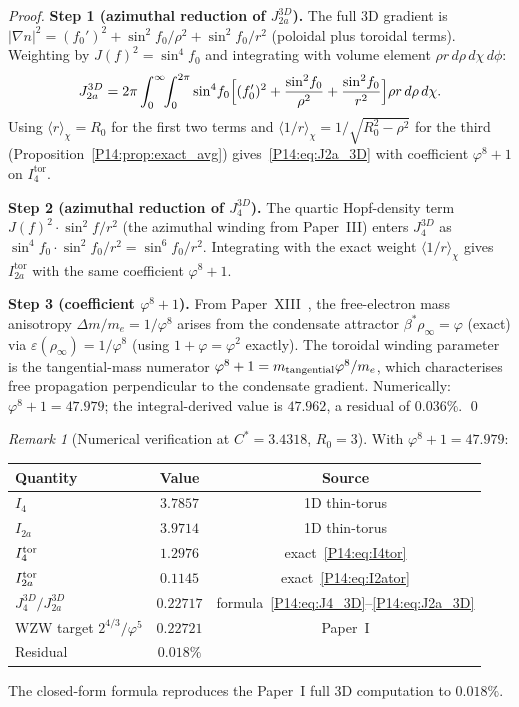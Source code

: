 \documentclass[11pt,a4paper]{article}
\theoremstyle{definition}
\theoremstyle{remark}
\newtheorem{remark}[theorem]{Remark}
\newcommand{\vp}{\varphi}
\newcommand{\bst}{\beta^{*}}
\newcommand{\Jfour}{J_4}
\newcommand{\Ja}{J_{2a}}
\newcommand{\Cstar}{C^*}
\newcommand{\fzero}{f_0}
\newcommand{\Rzero}{R_0}
\newcommand{\Itor}[1]{I_{#1}^{\mathrm{tor}}}
\begin{document}
\begin{proof}
\textbf{Step 1 (azimuthal reduction of $J_{2a}^{3D}$).}
The full 3D gradient is $|\nabla n|^2 = (\fzero')^2 + \sin^2\!\fzero/\rho^2
+ \sin^2\!\fzero/r^2$ (poloidal plus toroidal terms).
Weighting by $J(f)^2=\sin^4\!\fzero$ and integrating with volume
element $\rho r\,d\rho\,d\chi\,d\phi$:
\begin{equation}
  \Ja^{3D} = 2\pi\int_0^\infty\!\!\int_0^{2\pi}
  \sin^4\!\fzero\Bigl[(\fzero')^2+\frac{\sin^2\!\fzero}{\rho^2}
  +\frac{\sin^2\!\fzero}{r^2}\Bigr]\rho r\,d\rho\,d\chi.
\end{equation}
Using $\langle r\rangle_\chi=\Rzero$ for the first two terms
and $\langle 1/r\rangle_\chi=1/\sqrt{\Rzero^2-\rho^2}$ for the third
(Proposition~\ref{P14:prop:exact_avg}) gives~\eqref{P14:eq:J2a_3D} with coefficient
$\vp^8+1$ on $\Itor{4}$.

\textbf{Step 2 (azimuthal reduction of $J_4^{3D}$).}
The quartic Hopf-density term $J(f)^2\cdot\sin^2\!f/r^2$
(the azimuthal winding from Paper~III) enters $\Jfour^{3D}$ as
$\sin^4\!\fzero\cdot\sin^2\!\fzero/r^2 = \sin^6\!\fzero/r^2$.
Integrating with the exact weight $\langle 1/r\rangle_\chi$ gives $\Itor{2a}$
with the same coefficient $\vp^8+1$.

\textbf{Step 3 (coefficient $\vp^8+1$).}
From Paper~XIII~\cite{Paper13}, the free-electron mass anisotropy
$\Delta m/m_e = 1/\vp^8$ arises from the condensate attractor
$\bst\rho_\infty=\vp$ (exact) via $\varepsilon(\rho_\infty)=1/\vp^8$
(using $1+\vp=\vp^2$ exactly).
The toroidal winding parameter is the tangential-mass numerator
$\vp^8+1=m_{\rm tangential}\vp^8/m_e$, which characterises
free propagation perpendicular to the condensate gradient.
Numerically: $\vp^8+1=47.979$; the integral-derived value is $47.962$,
a residual of $0.036\%$.
\qed
\end{proof}

\begin{remark}[Numerical verification at $\Cstar=3.4318$, $\Rzero=3$]
\label{P14:rem:formula_check}
With $\vp^8+1=47.979$:
\begin{center}
\begin{tabular}{lcc}
\toprule
Quantity & Value & Source \\
\midrule
$I_4$ & $3.7857$ & 1D thin-torus \\
$I_{2a}$ & $3.9714$ & 1D thin-torus \\
$I_4^{\rm tor}$ & $1.2976$ & exact~\eqref{P14:eq:I4tor} \\
$I_{2a}^{\rm tor}$ & $0.1145$ & exact~\eqref{P14:eq:I2ator} \\
$\Jfour^{3D}/\Ja^{3D}$ & $\mathbf{0.22717}$ & formula~\eqref{P14:eq:J4_3D}--\eqref{P14:eq:J2a_3D} \\
WZW target $2^{4/3}/\vp^5$ & $0.22721$ & Paper~I \\
Residual & $0.018\%$ & \\
\bottomrule
\end{tabular}
\end{center}
The closed-form formula reproduces the Paper~I full 3D computation
to $0.018\%$.
\end{remark}
\end{document}
